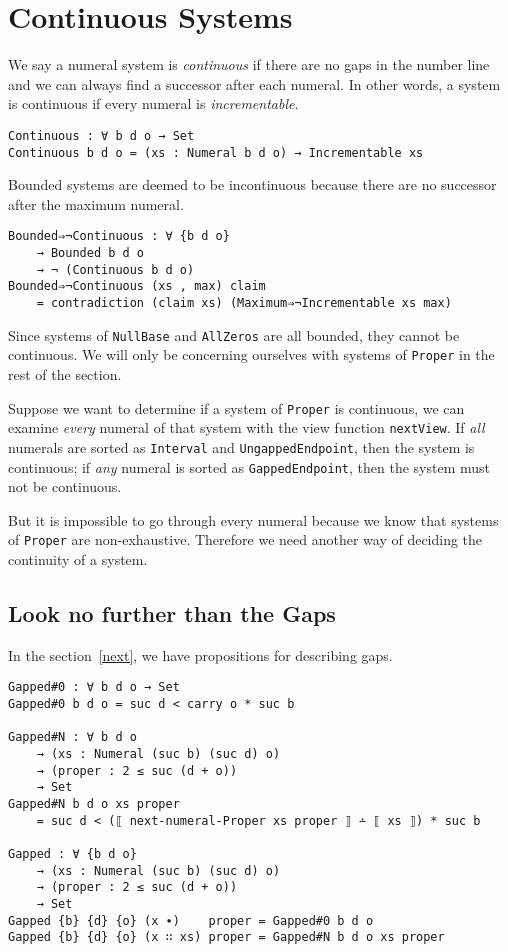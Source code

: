 \documentclass[\main/thesis.tex]{subfiles}
\begin{document}
\section{Continuous Systems}\label{continuous}

We say a numeral system is \textit{continuous} if there are no gaps in the number
line and we can always find a successor after each numeral.
In other words, a system is continuous if every numeral is \textit{incrementable}.

\begin{lstlisting}
Continuous : ∀ b d o → Set
Continuous b d o = (xs : Numeral b d o) → Incrementable xs
\end{lstlisting}

Bounded systems are deemed to be incontinuous because there are no successor
after the maximum numeral.

\begin{lstlisting}
Bounded⇒¬Continuous : ∀ {b d o}
    → Bounded b d o
    → ¬ (Continuous b d o)
Bounded⇒¬Continuous (xs , max) claim
    = contradiction (claim xs) (Maximum⇒¬Incrementable xs max)
\end{lstlisting}

Since systems of \lstinline|NullBase| and \lstinline|AllZeros| are all bounded,
they cannot be continuous. We will only be concerning ourselves with systems of
\lstinline|Proper| in the rest of the section.

Suppose we want to determine if a system of \lstinline|Proper| is continuous,
we can examine \textit{every} numeral of that system with the view function
\lstinline|nextView|.
If \textit{all} numerals are sorted as \lstinline|Interval| and
\lstinline|UngappedEndpoint|, then the system is continuous;
if \textit{any} numeral is sorted as \lstinline|GappedEndpoint|,
then the system must not be continuous.

But it is impossible to go through every numeral because we know that systems
of \lstinline|Proper| are non-exhaustive.
Therefore we need another way of deciding the continuity of a system.

\subsection{Look no further than the Gaps}

In the section~\ref{next}, we have propositions for describing gaps.

\begin{lstlisting}
Gapped#0 : ∀ b d o → Set
Gapped#0 b d o = suc d < carry o * suc b

Gapped#N : ∀ b d o
    → (xs : Numeral (suc b) (suc d) o)
    → (proper : 2 ≤ suc (d + o))
    → Set
Gapped#N b d o xs proper
    = suc d < (⟦ next-numeral-Proper xs proper ⟧ ∸ ⟦ xs ⟧) * suc b

Gapped : ∀ {b d o}
    → (xs : Numeral (suc b) (suc d) o)
    → (proper : 2 ≤ suc (d + o))
    → Set
Gapped {b} {d} {o} (x ∙)    proper = Gapped#0 b d o
Gapped {b} {d} {o} (x ∷ xs) proper = Gapped#N b d o xs proper
\end{lstlisting}
\end{document}
